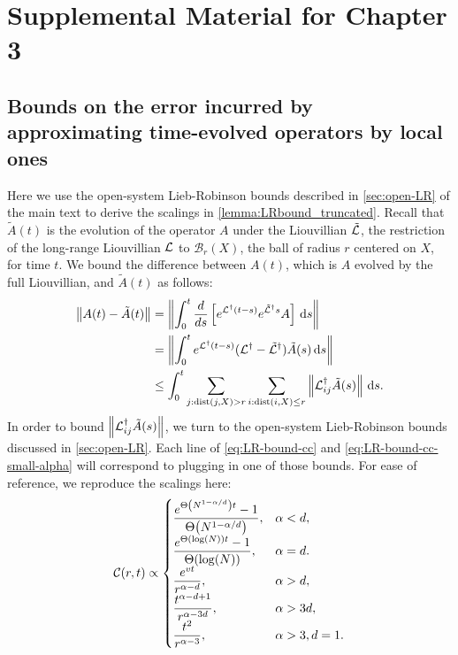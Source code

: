 \chapter{Supplemental Material for Chapter 3}
\label{app:occ}
\section{Bounds on the error incurred by approximating time-evolved operators by local ones}
\label{app:sim-local-obs}

Here we use the open-system Lieb-Robinson bounds described in \cref{sec:open-LR} of the main text to derive the scalings in \cref{lemma:LRbound_truncated}.
Recall that $\tilde A(t)$ is the evolution of the operator $A$ under the Liouvillian $\tilde {\mathcal{L}}$, the restriction of the long-range Liouvillian $\mathcal{L}$ to $\mathcal{B}_r(X)$, the ball of radius $r$ centered on $X$, for time $t$.
We bound the difference between $A(t)$, which is $A$ evolved by the full Liouvillian, and $\tilde A(t)$ as follows:
\begin{align}
  \left\|A(t)-\tilde A(t)\right\|&= \left\|\int_0^t \frac{d}{ds} \left[e^{\mathcal{L} ^\dagger(t-s)} e^{\tilde {\mathcal{L}}^\dagger s} A\right]\,\text{d}s\right\| \\
  &= \left\| \int_0^t e^{\mathcal{L}^\dagger (t-s)} (\mathcal{L}^\dagger-\tilde{\mathcal{L}}^\dagger)\tilde A(s)\,\text{d}s\right\| \\
  &\le \int_0^t \sum_{j:\text{dist}(j,X)>r} \sum_{i:\text{dist}(i,X)\le r} \left\|\mathcal{L}^\dagger_{ij} \tilde A(s)\right\|\,\text{d}s. \label{eq:clustering-bound}
\end{align}
In order to bound $\left\|\mathcal{L}^\dagger_{ij} \tilde A(s)\right\|$, we turn to the open-system Lieb-Robinson bounds discussed in \cref{sec:open-LR}.
Each line of \cref{eq:LR-bound-cc} and \cref{eq:LR-bound-cc-small-alpha} will correspond to plugging in one of those bounds.
For ease of reference, we reproduce the scalings here:
\begin{equation}
		\label{app:LR-bound-cc}
		\mathcal C(r,t) \propto \begin{cases}
        \ds \frac{e^{\Th{N^{1-\al/d}}t}-1}{\Th{N^{1-\al/d}}},& \al < d,
        \\ \ds \frac{e^{\Th{\log(N)}t}-1}{\Th{\log(N)}},& \al= d.
		\\ \ds \frac{e^{vt}}{r^{\al-d}},& \al > d,
		\\ \ds \frac{t^{\alpha-d+1}}{r^{\alpha-3d}},& \al > 3d,
		\\ \ds \frac{t^2}{r^{\alpha-3}},& \al > 3, d=1.
	\end{cases}
\end{equation}
